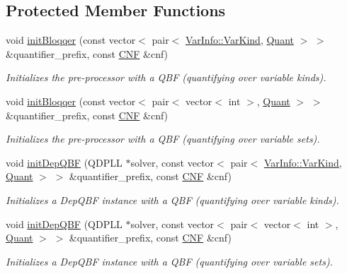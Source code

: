 \subsection*{Protected Member Functions}
\begin{DoxyCompactItemize}
\item 
void \hyperlink{classDepQBFApi_ac6a024dbf9355b9d7b17f8181642e469}{init\-Bloqqer} (const vector$<$ pair$<$ \hyperlink{classVarInfo_a64d1da76cf84fe674e5fef9764ef11cf}{Var\-Info\-::\-Var\-Kind}, \hyperlink{classQBFSolver_ac091e263cb55286cc07b2451bcf4d3c7}{Quant} $>$ $>$ \&quantifier\-\_\-prefix, const \hyperlink{classCNF}{C\-N\-F} \&cnf)
\begin{DoxyCompactList}\small\item\em Initializes the pre-\/processor with a Q\-B\-F (quantifying over variable kinds). \end{DoxyCompactList}\item 
void \hyperlink{classDepQBFApi_a5f7ea6239edb4d78bbda33091f51cdf5}{init\-Bloqqer} (const vector$<$ pair$<$ vector$<$ int $>$, \hyperlink{classQBFSolver_ac091e263cb55286cc07b2451bcf4d3c7}{Quant} $>$ $>$ \&quantifier\-\_\-prefix, const \hyperlink{classCNF}{C\-N\-F} \&cnf)
\begin{DoxyCompactList}\small\item\em Initializes the pre-\/processor with a Q\-B\-F (quantifying over variable sets). \end{DoxyCompactList}\item 
void \hyperlink{classDepQBFApi_a2f99baf1fb6759458979e799ce706bc4}{init\-Dep\-Q\-B\-F} (Q\-D\-P\-L\-L $\ast$solver, const vector$<$ pair$<$ \hyperlink{classVarInfo_a64d1da76cf84fe674e5fef9764ef11cf}{Var\-Info\-::\-Var\-Kind}, \hyperlink{classQBFSolver_ac091e263cb55286cc07b2451bcf4d3c7}{Quant} $>$ $>$ \&quantifier\-\_\-prefix, const \hyperlink{classCNF}{C\-N\-F} \&cnf)
\begin{DoxyCompactList}\small\item\em Initializes a Dep\-Q\-B\-F instance with a Q\-B\-F (quantifying over variable kinds). \end{DoxyCompactList}\item 
void \hyperlink{classDepQBFApi_af1e78176cae55e6a76e193d216b5a3dc}{init\-Dep\-Q\-B\-F} (Q\-D\-P\-L\-L $\ast$solver, const vector$<$ pair$<$ vector$<$ int $>$, \hyperlink{classQBFSolver_ac091e263cb55286cc07b2451bcf4d3c7}{Quant} $>$ $>$ \&quantifier\-\_\-prefix, const \hyperlink{classCNF}{C\-N\-F} \&cnf)
\begin{DoxyCompactList}\small\item\em Initializes a Dep\-Q\-B\-F instance with a Q\-B\-F (quantifying over variable sets). \end{DoxyCompactList}\item 

\end{DoxyCompactItemize}
